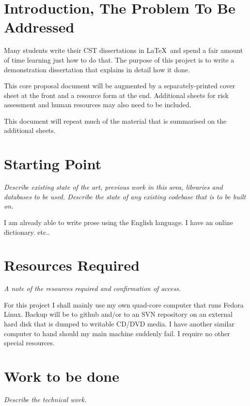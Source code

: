 

\section*{Introduction, The Problem To Be Addressed}


Many students write their CST dissertations in \LaTeX\ and
spend a fair amount of time learning just how to do that. The purpose of 
this project is to write a demonstration dissertation that explains in
detail how it done.  

This core proposal document will be augmented by a separately-printed
cover sheet at the front and a resource form at the end.  Additional
sheets for risk assessment and human resources may also need to be included.

This document will repeat much of the material that is summarised on the additional sheets.

\section*{Starting Point}

{\em Describe existing state of the art, previous work in this area, libraries and databases to be used.
Describe the state of any existing codebase that is to be built on.  }

I am already able to write prose using the English language. I have an online dictionary. etc..

\section*{Resources Required}

{\em A note of the resources required and confirmation of access.}

For this project I shall mainly use my own quad-core computer that runs Fedora Linux. Backup
will be to github and/or to an SVN repository on an external hard disk that is dumped to writable CD/DVD media.
I have another similar computer to hand should my main machine suddenly fail.
I require no other special resources.

\section*{Work to be done}

{\em Describe the technical work.}

